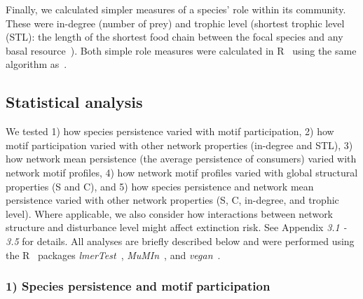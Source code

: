 \documentclass[12pt]{article}
\begin{document}
\begin{spacing}{2.0}
        Finally, we calculated simpler measures of a species' role within its community.
        These were in-degree (number of prey) and trophic level (shortest trophic level (STL): the length of the shortest food chain between the focal species and any basal resource~\citep{Williams2004}).
        Both simple role measures were calculated in R~\citep{R} using the same algorithm as~\citet{Eklof2013}.
        


	\subsection*{Statistical analysis} 

    	We tested 1) how species persistence varied with motif participation, 2) how motif participation varied with other network properties (in-degree and STL), 3) how network mean persistence (the average persistence of consumers) varied with network motif profiles, 4) how network motif profiles varied with global structural properties (S and C), and 5) how species persistence and network mean persistence varied with other network properties (S, C, in-degree, and trophic level).
        Where applicable, we also consider how interactions between network structure and disturbance level might affect extinction risk.
    	See Appendix \emph{3.1 - 3.5} for details. 
    	All analyses are briefly described below and were performed using the R~\citep{R} packages \emph{lmerTest}~\citep{lmerTest}, \emph{MuMIn}~\citep{MuMIn}, and \emph{vegan}~\citep{vegan}.

        
        \subsubsection*{1) Species persistence and motif participation}


\end{spacing}
\end{document}
